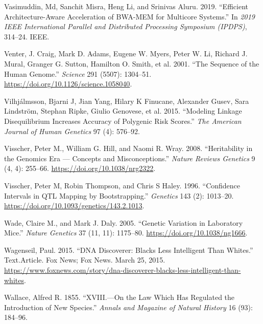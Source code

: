 \documentclass[
]{book}
\newlength{\cslhangindent}
\newlength{\cslentryspacingunit} %
\newenvironment{CSLReferences}[2] %
 {%
  \setlength{\parindent}{0pt}
  \ifodd #1
  \let\oldpar\par
  \def\par{\hangindent=\cslhangindent\oldpar}
  \fi
  \setlength{\parskip}{#2\cslentryspacingunit}
 }%
 {}
\begin{document}
\begin{CSLReferences}{1}{0}
\leavevmode{}%
Vasimuddin, Md, Sanchit Misra, Heng Li, and Srinivas Aluru. 2019. {``Efficient Architecture-Aware Acceleration of {BWA-MEM} for Multicore Systems.''} In \emph{2019 {IEEE International Parallel} and {Distributed Processing Symposium} ({IPDPS})}, 314--24. {IEEE}.

\leavevmode{}%
Venter, J. Craig, Mark D. Adams, Eugene W. Myers, Peter W. Li, Richard J. Mural, Granger G. Sutton, Hamilton O. Smith, et al. 2001. {``The {Sequence} of the {Human Genome}.''} \emph{Science} 291 (5507): 1304--51. \url{https://doi.org/10.1126/science.1058040}.

\leavevmode{}%
Vilhjálmsson, Bjarni J, Jian Yang, Hilary K Finucane, Alexander Gusev, Sara Lindström, Stephan Ripke, Giulio Genovese, et al. 2015. {``Modeling Linkage Disequilibrium Increases Accuracy of Polygenic Risk Scores.''} \emph{The American Journal of Human Genetics} 97 (4): 576--92.

\leavevmode{}%
Visscher, Peter M., William G. Hill, and Naomi R. Wray. 2008. {``Heritability in the Genomics Era --- Concepts and Misconceptions.''} \emph{Nature Reviews Genetics} 9 (4, 4): 255--66. \url{https://doi.org/10.1038/nrg2322}.

\leavevmode{}%
Visscher, Peter M, Robin Thompson, and Chris S Haley. 1996. {``Confidence {Intervals} in {QTL Mapping} by {Bootstrapping}.''} \emph{Genetics} 143 (2): 1013--20. \url{https://doi.org/10.1093/genetics/143.2.1013}.

\leavevmode{}%
Wade, Claire M., and Mark J. Daly. 2005. {``Genetic Variation in Laboratory Mice.''} \emph{Nature Genetics} 37 (11, 11): 1175--80. \url{https://doi.org/10.1038/ng1666}.

\leavevmode{}%
Wagenseil, Paul. 2015. {``{DNA Discoverer}: {Blacks Less Intelligent Than Whites}.''} Text.Article. {Fox News}; {Fox News}. March 25, 2015. \url{https://www.foxnews.com/story/dna-discoverer-blacks-less-intelligent-than-whites}.

\leavevmode{}%
Wallace, Alfred R. 1855. {``{XVIII}.---{On} the Law Which Has Regulated the Introduction of New Species.''} \emph{Annals and Magazine of Natural History} 16 (93): 184--96.


\end{CSLReferences}
\end{document}
